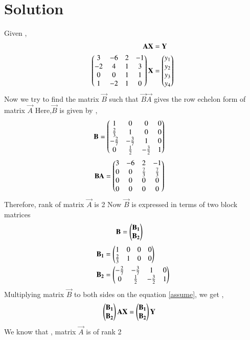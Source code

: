 \documentclass[journal,12pt,twocolumn]{IEEEtran}
\begin{document}
\section{Solution}
Given , 
\begin{align}
    \mathbf{A}\mathbf{X}&=\mathbf{Y}\label{assume}\\
    \begin{pmatrix}3 & -6 & 2 & -1\\-2 & 4 & 1 & 3\\0 & 0 & 1& 1\\1 & -2 & 1 & 0\end{pmatrix}\mathbf{X}&=\begin{pmatrix}y_1 \\y_2\\y_3\\y_4\end{pmatrix}\label{given}
\end{align}
Now we try to find the matrix $\vec{B}$ such that $\vec{B}\vec{A}$ gives the row echelon form of matrix $\vec{A}$
Here,$\vec{B}$ is given by , 
\begin{align}
    \mathbf{B}&=\begin{pmatrix}1&0&0&0\\\frac{2}{3}&1&0&0\\-\frac{2}{7}&-\frac{3}{7}&1&0\\0&\frac{1}{2}&-\frac{3}{2}&1\end{pmatrix}
\end{align}
\begin{align}
    \mathbf{B}\mathbf{A}&=\begin{pmatrix}3 & -6 & 2 & -1\\0 & 0 & \frac{7}{3} & \frac{7}{3}\\0 & 0 & 0& 0\\0 & 0 & 0 & 0\end{pmatrix}\label{ref3}
\end{align}
Therefore, rank of matrix $\vec{A}$ is 2
Now $\vec{B}$ is expressed in terms of two block matrices
\begin{align}
    \mathbf{B}&=\begin{pmatrix}\mathbf{B_1}\\\mathbf{B_2}\end{pmatrix}
\end{align}
\begin{align}
    \mathbf{B_1}&=\begin{pmatrix}1&0&0&0\\\frac{2}{3}&1&0&0\end{pmatrix}\\
    \mathbf{B_2}&=\begin{pmatrix}-\frac{2}{7}&-\frac{3}{7}&1&0\\0&\frac{1}{2}&-\frac{3}{2}&1\end{pmatrix}
\end{align}
Multiplying matrix $\vec{B}$ to both sides on the equation \eqref{assume}, we get , 
\begin{align}
    \begin{pmatrix}\mathbf{B_1}\\\mathbf{B_2}\end{pmatrix}\mathbf{A}\mathbf{X}&=\begin{pmatrix}\mathbf{B_1}\\\mathbf{B_2}\end{pmatrix}\mathbf{Y}\label{aug}
\end{align}
We know that , matrix $\vec{A}$ is of rank 2 
\end{document}
